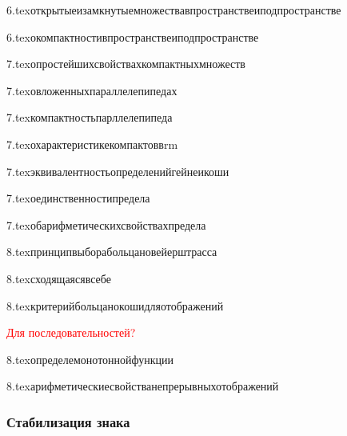 {6.tex}{открытыеизамкнутыемножествавпространствеиподпространстве}

{6.tex}{окомпактностивпространствеиподпространстве}

{7.tex}{опростейшихсвойствахкомпактныхмножеств}

{7.tex}{овложенныхпараллелепипедах}

{7.tex}{компактностьпарллелепипеда}

{7.tex}{охарактеристикекомпактоввrm}

{7.tex}{эквивалентностьопределенийгейнеикоши}

{7.tex}{оединственностипредела}



{7.tex}{обарифметическихсвойствахпредела}

{8.tex}{принципвыборабольцановейерштрасса}

{8.tex}{сходящаясявсебе}


{8.tex}{критерийбольцанокошидляотображений}

\textcolor{red}{Для последовательностей?}

{8.tex}{определемонотоннойфункции}

{8.tex}{арифметическиесвойстванепрерывныхотображений}

\subsubsection{Стабилизация знака}

